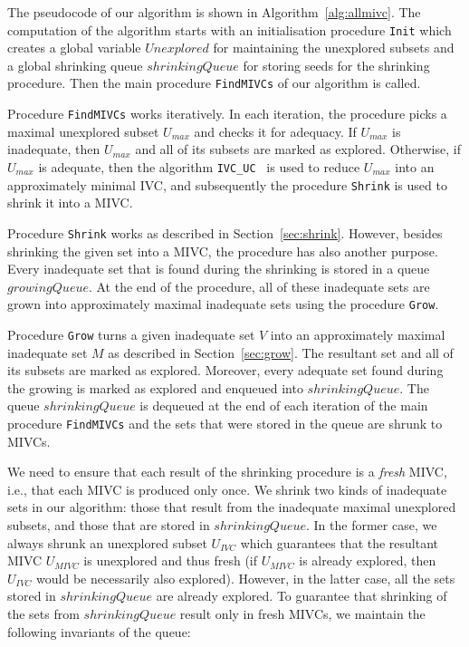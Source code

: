 The pseudocode of our algorithm is shown in Algorithm~\ref{alg:allmivc}. The computation of the algorithm starts with an initialisation procedure \texttt{Init} which creates a global variable $\mathit{Unexplored}$ for maintaining the unexplored subsets and a global shrinking queue $\mathit{shrinkingQueue}$ for storing seeds for the shrinking procedure. Then the main procedure \texttt{FindMIVCs} of our algorithm is called.

Procedure \texttt{FindMIVCs} works iteratively. In each iteration, the procedure picks a maximal unexplored subset $U_{max}$ and checks it for adequacy. If $U_{max}$ is inadequate, then $U_{max}$ and all of its subsets are marked as explored. Otherwise, if $U_{max}$ is adequate, then the algorithm \texttt{IVC\_UC}~\cite{Ghass16} is used to reduce $U_{max}$ into an approximately minimal IVC, and subsequently the procedure \texttt{Shrink} is used to shrink it into a MIVC.

Procedure \texttt{Shrink} works as described in Section~\ref{sec:shrink}. However, besides shrinking the given set into a MIVC, the procedure has also another purpose. Every inadequate set that is found during the shrinking is stored in a queue $\mathit{growingQueue}$. At the end of the procedure, all of these inadequate sets are grown into approximately maximal inadequate sets using the procedure \texttt{Grow}.

Procedure \texttt{Grow} turns a given inadequate set $V$ into an approximately maximal inadequate set $M$ as described in Section~\ref{sec:grow}. The resultant set and all of its subsets are marked as explored. Moreover, every adequate set found during the growing is marked as explored and enqueued into $\mathit{shrinkingQueue}$.
The queue $\mathit{shrinkingQueue}$ is dequeued at the end of each iteration of the main procedure \texttt{FindMIVCs} and the sets that were stored in the queue are shrunk to MIVCs.


We need to ensure that each result of the shrinking procedure is a \emph{fresh} MIVC, i.e., that each MIVC is produced only once.
We shrink two kinds of inadequate sets in our algorithm: those that result from the inadequate maximal unexplored subsets, and those that are stored in $\mathit{shrinkingQueue}$. In the former case, we always shrunk an unexplored subset $U_{\mathit{IVC}}$ which guarantees that the resultant MIVC $U_{\mathit{MIVC}}$ is unexplored and thus fresh (if $U_{\mathit{MIVC}}$ is already explored, then $U_{\mathit{IVC}}$ would be necessarily also explored).
However, in the latter case, all the sets stored in $\mathit{shrinkingQueue}$ are already explored. To guarantee that shrinking of the sets from $\mathit{shrinkingQueue}$ result only in fresh MIVCs, we maintain the following invariants of the queue:

